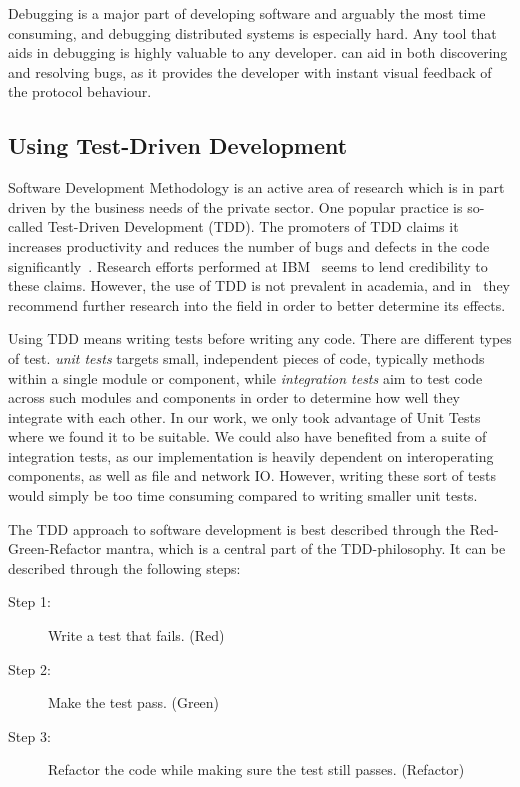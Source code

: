 Debugging is a major part of developing software and arguably the most
time consuming, and debugging distributed systems is especially hard.
Any tool that aids in debugging is highly valuable to any developer.
\demo{} can aid in both discovering and resolving bugs, as it provides
the developer with instant visual feedback of the protocol behaviour.

\subsection{Using Test-Driven Development}

Software Development Methodology is an active area of research
which is in part driven by the business needs of the private
sector\cite{janzen2005test}. One popular practice is so-called Test-Driven
Development (TDD). The promoters of TDD claims it increases
productivity and reduces the number of bugs and defects in the
code significantly~\cite{beck2003test}. Research
efforts performed at IBM~\cite{maximilien2003assessing} seems to
lend credibility to these claims. However, the use of TDD is not
prevalent in academia, and in~\cite{janzen2005test} they
recommend further research into the field in order to better
determine its effects.

Using TDD means writing tests before writing any code. There are
different types of test. \emph{unit tests} targets small,
independent pieces of code, typically methods within a single
module or component, while \emph{integration tests} aim to test
code across such modules and components in order to determine
how well they integrate with each other. In our work, we only
took advantage of Unit Tests where we found it to be suitable.
We could also have benefited from a suite of integration tests,
as our implementation is heavily dependent on interoperating
components, as well as file and network IO\@. However, writing
these sort of tests would simply be too time consuming compared
to writing smaller unit tests.

The TDD approach to software development is best described through the
Red-Green-Refactor mantra, which is a central part of the
TDD-philosophy. It can be described through the following steps:

\begin{description}
    \item[Step 1:] Write a test that fails. (Red)
    \item[Step 2:] Make the test pass. (Green)
    \item[Step 3:] Refactor the code while making sure the test
        still passes. (Refactor)
\end{description}

